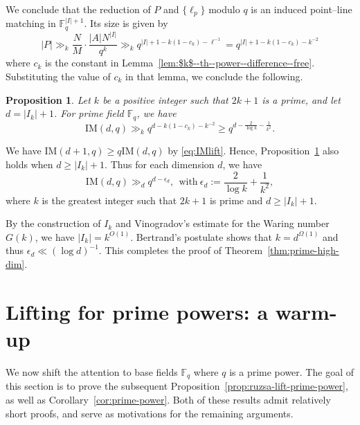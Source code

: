 \documentclass[12pt,reqno]{amsart}
\theoremstyle{plain}
\newtheorem{proposition}[theorem]{Proposition}
\theoremstyle{definition}
\newcommand{\F}{\mathbb{F}}
\newcommand{\IM}{\mathrm{IM}}
\newcommand{\1}{\mathbf{1}}
\newcommand{\abs}[1]{\left|#1\right|}
\begin{document}
We conclude that the reduction of $P$ and $\{\ell_p\}$ modulo $q$ is an induced point--line matching in $\F_q^{|I| + 1}$. Its size is given by
$$\abs{P} \gg_k \frac{N}{M} \cdot\frac{|A| N^{|I|}}{q^k} \gg_k q^{|I| + 1 - k(1 - c_k) - \ell^{-1}} = q^{|I| + 1 - k(1 - c_k) - k^{-2}}$$
where $c_k$ is the constant in Lemma~\ref{lem:$k$--th--power--difference--free}. Substituting the value of $c_k$ in that lemma, we conclude the following.
\begin{proposition}
    \label{prop:Ikd}
    Let $k$ be a positive integer such that $2k + 1$ is a prime, and let $d = \abs{I_k} + 1$. For prime field $\F_q$, we have
    $$\IM(d, q) \gg_k q^{d - k(1 - c_k) - k^{-2}} \geq q^{d - \frac{2}{\log k} - \frac{1}{k^2}}.$$
\end{proposition}
 We have $\IM(d + 1, q) \geq q \IM(d, q)$ by \eqref{eq:IMlift}.
 Hence, Proposition~\ref{prop:Ikd} also holds when $d \geq \abs{I_k} + 1$. Thus for each dimension $d$, we have
$$\IM(d, q) \gg_d q^{d - \epsilon_d},\ \ \text{with}\ \epsilon_d := \frac{2}{\log k} + \frac{1}{k^2},$$
where $k$ is the greatest integer such that $2k + 1$ is prime and $d \geq \abs{I_k} + 1$.

By the construction of $I_k$ and Vinogradov's estimate for the Waring number $G(k)$, we have $\abs{I_k} = k^{O(1)}$. Bertrand's postulate shows that $k = d^{\Omega(1)}$ and thus $\epsilon_d \ll (\log d)^{-1}$. This completes the proof of Theorem~\ref{thm:prime-high-dim}.




\section{Lifting for prime powers: a warm-up}

We now shift the attention to base fields $\F_q$ where $q$ is a prime power. The goal of this section is to prove the subsequent Proposition~\ref{prop:ruzsa-lift-prime-power}, as well as Corollary~\ref{cor:prime-power}. Both of these results admit relatively short proofs, and serve as motivations for the remaining arguments. 
\end{document}
